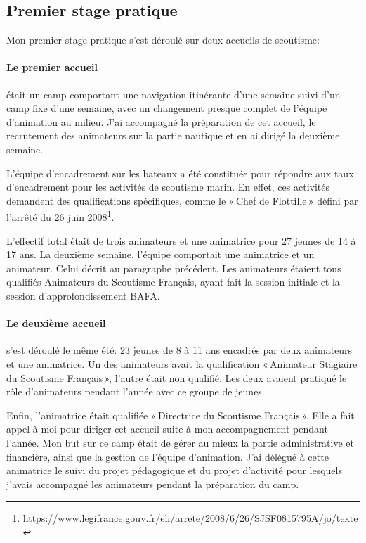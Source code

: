 \documentclass[titlepage,11pt,a4paper]{article}
\begin{document}
\subsection{Premier stage pratique}

Mon premier stage pratique s'est déroulé sur deux accueils de scoutisme:

\paragraph{Le premier accueil} était un camp comportant une navigation itinérante d'une semaine suivi d'un
camp fixe d'une semaine, avec un changement presque complet de l'équipe d'animation au
milieu. J'ai accompagné la préparation de cet accueil, le recrutement des animateurs sur
la partie nautique et en ai dirigé la deuxième semaine.

L'équipe d'encadrement sur les bateaux a été constituée pour répondre aux taux
d'encadrement pour les activités de scoutisme marin. En effet, ces activités demandent
des qualifications spécifiques, comme le «\,Chef de Flottille\,» défini par
l'arrêté du 26 juin 2008\footnote{https://www.legifrance.gouv.fr/eli/arrete/2008/6/26/SJSF0815795A/jo/texte}.

L'effectif total était de trois animateurs et une animatrice pour 27 jeunes de 14 à 17
ans. La deuxième semaine, l'équipe comportait une animatrice et un animateur. Celui décrit
au paragraphe précédent. Les animateurs étaient tous qualifiés Animateurs du Scoutisme Français,
ayant fait la session initiale et la session d'approfondissement BAFA\@.

\paragraph{Le deuxième accueil} s'est déroulé le même été: 23 jeunes de 8 à 11 ans
encadrés par deux animateurs et une animatrice. Un des animateurs avait la qualification
«\,Animateur Stagiaire du Scoutisme Français\,», l'autre était non qualifié. Les deux
avaient pratiqué le rôle d'animateurs pendant l'année avec ce groupe de jeunes.

Enfin, l'animatrice était qualifiée «\,Directrice du Scoutisme Français\,». Elle a
fait appel à moi pour diriger cet accueil suite à mon accompagnement pendant l'année. Mon but sur ce camp était
de gérer au mieux la partie administrative et financière, ainsi que la gestion de l'équipe
d'animation. J'ai délégué à cette animatrice le suivi du projet pédagogique et du projet
d'activité pour lesquels j'avais accompagné les animateurs pendant la
préparation du camp.
\end{document}
